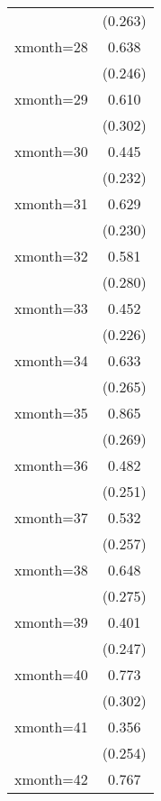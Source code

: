 \begin{table}[htbp]
\begin{tabular}{l*{1}{c}}
                    &     (0.263)         \\
[1em]
xmonth=28           &       0.638\sym{*}  \\
                    &     (0.246)         \\
[1em]
xmonth=29           &       0.610\sym{*}  \\
                    &     (0.302)         \\
[1em]
xmonth=30           &       0.445         \\
                    &     (0.232)         \\
[1em]
xmonth=31           &       0.629\sym{**} \\
                    &     (0.230)         \\
[1em]
xmonth=32           &       0.581\sym{*}  \\
                    &     (0.280)         \\
[1em]
xmonth=33           &       0.452\sym{*}  \\
                    &     (0.226)         \\
[1em]
xmonth=34           &       0.633\sym{*}  \\
                    &     (0.265)         \\
[1em]
xmonth=35           &       0.865\sym{**} \\
                    &     (0.269)         \\
[1em]
xmonth=36           &       0.482         \\
                    &     (0.251)         \\
[1em]
xmonth=37           &       0.532\sym{*}  \\
                    &     (0.257)         \\
[1em]
xmonth=38           &       0.648\sym{*}  \\
                    &     (0.275)         \\
[1em]
xmonth=39           &       0.401         \\
                    &     (0.247)         \\
[1em]
xmonth=40           &       0.773\sym{*}  \\
                    &     (0.302)         \\
[1em]
xmonth=41           &       0.356         \\
                    &     (0.254)         \\
[1em]
xmonth=42           &       0.767\sym{*}  \\

\end{tabular}
\end{table}

